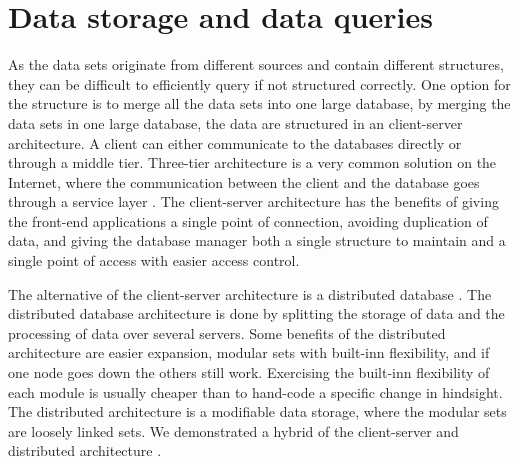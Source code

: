 


\section{Data storage and data queries} %
\label{sec:discussion_data_storage_and_data_queries}
As the data sets originate from different sources and contain different
structures, they can be difficult to efficiently query if not structured
correctly. One option for the structure is to merge all the
data sets into one large database, by merging the data sets in one large
database, the data are structured in an client-server architecture. 
A client can either communicate to the databases directly or through a middle
tier. Three-tier architecture is a very common solution on the Internet, where 
the communication between the client and the database goes through a service 
layer \cite[pp. 294-297]{toftHanseMallaugDatabaser}. The client-server 
architecture has the benefits of giving the front-end applications a single 
point of connection, avoiding duplication of data, and giving the database 
manager both a single structure to maintain and a single point of access with 
easier access control.

The alternative of the client-server architecture is a distributed
database \cite[pp. 301-303]{toftHanseMallaugDatabaser}. The distributed database
architecture is done by splitting the storage of data and the processing of
data over several servers. Some benefits of the distributed architecture are 
easier expansion, modular sets with built-inn flexibility, and if one node 
goes down the others still work. Exercising the built-inn flexibility of each
module is usually cheaper than to hand-code a specific change in hindsight\cite[pp. 117-130]{Bass:2012:SAP:2392670}. The distributed architecture is a 
modifiable data storage, where the modular sets are loosely linked sets. 
We demonstrated a hybrid of the client-server and distributed
architecture \cite[pp. 297-299]{toftHanseMallaugDatabaser}.

